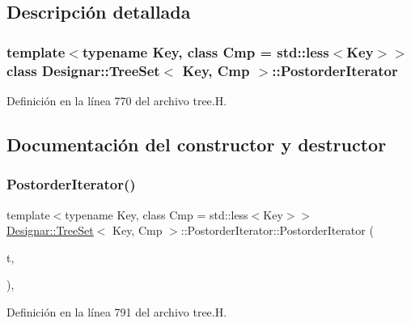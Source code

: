 \subsection{Descripción detallada}
\subsubsection*{template$<$typename Key, class Cmp = std\+::less$<$\+Key$>$$>$\newline
class Designar\+::\+Tree\+Set$<$ Key, Cmp $>$\+::\+Postorder\+Iterator}



Definición en la línea 770 del archivo tree.\+H.



\subsection{Documentación del constructor y destructor}
\mbox{\label{class_designar_1_1_tree_set_1_1_postorder_iterator_ab562263cb488221eb2cfc53b9785a0e6}} 
\subsubsection{\texorpdfstring{Postorder\+Iterator()}{PostorderIterator()}\hspace{0.1cm}{\footnotesize\ttfamily [1/4]}}
{\footnotesize\ttfamily template$<$typename Key, class Cmp = std\+::less$<$\+Key$>$$>$ \\
\hyperlink{class_designar_1_1_tree_set}{Designar\+::\+Tree\+Set}$<$ Key, Cmp $>$\+::Postorder\+Iterator\+::\+Postorder\+Iterator (\begin{DoxyParamCaption}\item[{const \hyperlink{class_designar_1_1_tree_set}{Tree\+Set} \&}]{t,  }\item[{int}]{ }\end{DoxyParamCaption})\hspace{0.3cm}{\ttfamily [inline]}, {\ttfamily [protected]}}



Definición en la línea 791 del archivo tree.\+H.

